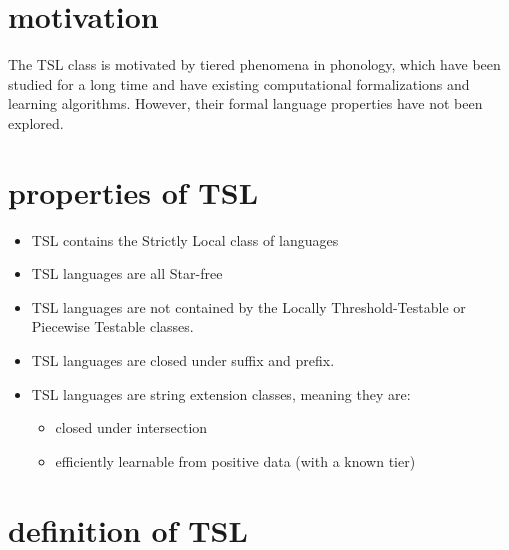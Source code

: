 
\begin{abstract}
\begin{enumerate}
  \item First defines the Tier-based Strictly Local (TSL) class of languages.
  \item Review properties of this class.
  \item Hypothesize that All phonotactic processes are TSL.
\end{enumerate}
\end{abstract}

\section*{motivation}

The TSL class is motivated by tiered phenomena in phonology, which have been studied for a long time and have existing computational formalizations and learning algorithms. However, their formal language properties have not been explored.

\section*{properties of TSL}

\begin{itemize}
  \item TSL contains the Strictly Local class of languages
  \item TSL languages are all Star-free
  \item TSL languages are not contained by the Locally Threshold-Testable or Piecewise Testable classes.
  \item TSL languages are closed under suffix and prefix.
  \item TSL languages are string extension classes, meaning they are:
  \begin{itemize}
    \item closed under intersection
    \item efficiently learnable from positive data (with a known tier)
  \end{itemize}
\end{itemize}

\section*{definition of TSL}


